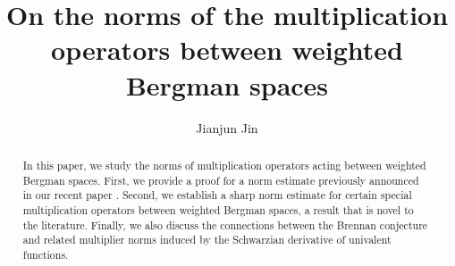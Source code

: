 \documentclass[10pt]{amsart}
\theoremstyle{definition}    %
\numberwithin{equation}{section}
\begin{document}
\begin{center}
\title[The norms of multiplication operators]{On the norms of the multiplication operators between weighted Bergman spaces}
\end{center}

\author{Jianjun Jin}
\address{School of Mathematics Sciences, Hefei University of Technology, Xuancheng Campus, Xuancheng 242000, P.R.China}



\begin{abstract}
In this paper, we study the norms of multiplication operators acting between weighted Bergman spaces. First, we provide a proof for a norm estimate previously announced in our recent paper \cite{Jin-c}. Second, we establish a sharp norm estimate for certain special multiplication operators between weighted Bergman spaces, a result that is novel to the literature. Finally, we also discuss the connections between the Brennan conjecture and related multiplier norms induced by the Schwarzian derivative of univalent functions.
\end{abstract}

\maketitle
\end{document}
